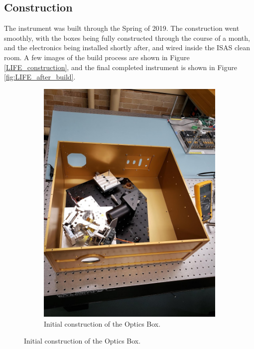 \subsection{Construction}\label{construction_sec}
The instrument was built through the Spring of 2019. The construction went smoothly, with the boxes being fully constructed through the course of a month, and the electronics being installed shortly after, and wired inside the ISAS clean room. A few images of the build process are shown in Figure \ref{LIFE_construction}, and the final completed instrument is shown in Figure \ref{fig:LIFE_after_build}.

\begin{figure}
    \centering
    \begin{subfigure}[h]{0.4\textwidth}
        \centering
        \includegraphics[width=\textwidth]{chap3_images/Optics_during_construction.jpg}
        \caption{Initial construction of the Optics Box.}
        \label{fig:OB_construction}

\end{subfigure}
\end{figure}
